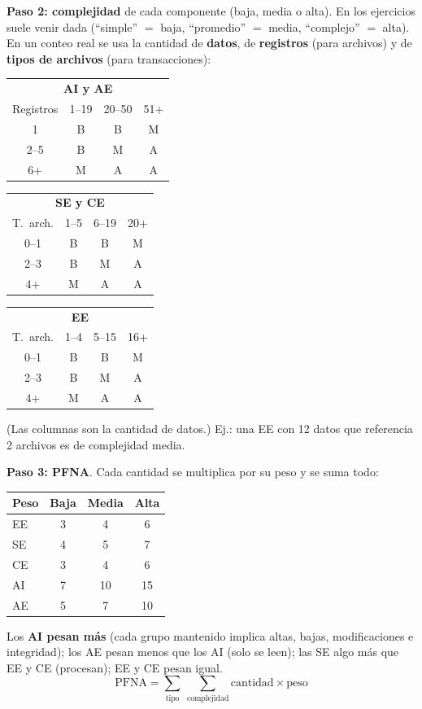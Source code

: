 \documentclass[11pt,a4paper]{article}
\begin{document}
\textbf{Paso 2: complejidad} de cada componente (baja, media o alta). En los ejercicios suele venir dada
(``simple'' $=$ baja, ``promedio'' $=$ media, ``complejo'' $=$ alta). En un conteo real se usa la cantidad de
\textbf{datos}, de \textbf{registros} (para archivos) y de \textbf{tipos de archivos} (para transacciones):
\begin{center}\scriptsize
\begin{tabular}{c|ccc}
\toprule
\multicolumn{4}{c}{\textbf{AI y AE}}\\
Registros & 1--19 & 20--50 & 51+\\
\midrule
1 & B & B & M\\
2--5 & B & M & A\\
6+ & M & A & A\\
\bottomrule
\end{tabular}\qquad
\begin{tabular}{c|ccc}
\toprule
\multicolumn{4}{c}{\textbf{SE y CE}}\\
T.\ arch. & 1--5 & 6--19 & 20+\\
\midrule
0--1 & B & B & M\\
2--3 & B & M & A\\
4+ & M & A & A\\
\bottomrule
\end{tabular}\qquad
\begin{tabular}{c|ccc}
\toprule
\multicolumn{4}{c}{\textbf{EE}}\\
T.\ arch. & 1--4 & 5--15 & 16+\\
\midrule
0--1 & B & B & M\\
2--3 & B & M & A\\
4+ & M & A & A\\
\bottomrule
\end{tabular}
\end{center}
(Las columnas son la cantidad de datos.) Ej.: una EE con 12 datos que referencia 2 archivos es de complejidad
media.

\textbf{Paso 3: PFNA}. Cada cantidad se multiplica por su peso y se suma todo:
\begin{center}
\begin{minipage}{0.4\textwidth}\centering\small
\begin{tabular}{lccc}
\toprule
\textbf{Peso} & \textbf{Baja} & \textbf{Media} & \textbf{Alta}\\
\midrule
EE & 3 & 4 & 6\\
SE & 4 & 5 & 7\\
CE & 3 & 4 & 6\\
AI & 7 & 10 & 15\\
AE & 5 & 7 & 10\\
\bottomrule
\end{tabular}
\end{minipage}\hfill
\begin{minipage}{0.56\textwidth}\small
Los \textbf{AI pesan más} (cada grupo mantenido implica altas, bajas, modificaciones e integridad); los AE pesan
menos que los AI (solo se leen); las SE algo más que EE y CE (procesan); EE y CE pesan igual.
\[ \text{PFNA} = \sum_{\text{tipo}}\ \sum_{\text{complejidad}} \text{cantidad} \times \text{peso} \]
\end{minipage}
\end{center}
\end{document}
